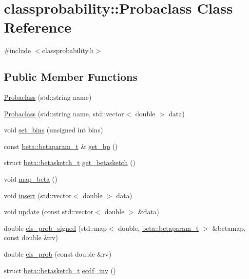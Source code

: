 \hypertarget{classclassprobability_1_1_probaclass}{}\section{classprobability\+:\+:Probaclass Class Reference}
\label{classclassprobability_1_1_probaclass}


{\ttfamily \#include $<$classprobability.\+h$>$}

\subsection*{Public Member Functions}
\begin{DoxyCompactItemize}
\item 
\hyperlink{classclassprobability_1_1_probaclass_a06ff3fdb60cfa668c8c7ade67b699775}{Probaclass} (std\+::string name)
\item 
\hyperlink{classclassprobability_1_1_probaclass_ab8a1155baa99003fc7bc1704b94522c2}{Probaclass} (std\+::string name, std\+::vector$<$ double $>$ data)
\item 
void \hyperlink{classclassprobability_1_1_probaclass_a9c4058ea810bb0f624f979650fc58986}{set\+\_\+bins} (unsigned int bins)
\item 
const \hyperlink{structclassprobability_1_1beta_1_1betaparam__t}{beta\+::betaparam\+\_\+t} \& \hyperlink{classclassprobability_1_1_probaclass_a8863bbdbf8a66362cb87886bfe75d49f}{get\+\_\+bp} ()
\item 
struct \hyperlink{structclassprobability_1_1beta_1_1betasketch__t}{beta\+::betasketch\+\_\+t} \hyperlink{classclassprobability_1_1_probaclass_a48c45140762604e5f7bfc8bc532e20b1}{get\+\_\+betasketch} ()
\item 
void \hyperlink{classclassprobability_1_1_probaclass_a2c96ae10e7c464ef31e3975fc9d2dbf9}{map\+\_\+beta} ()
\item 
void \hyperlink{classclassprobability_1_1_probaclass_ac096a46f36d394976a4bdafc075006bb}{insert} (std\+::vector$<$ double $>$ data)
\item 
void \hyperlink{classclassprobability_1_1_probaclass_a27bcfca6ba7b7faadc3428b7567821ca}{update} (const std\+::vector$<$ double $>$ \&data)
\item 
double \hyperlink{classclassprobability_1_1_probaclass_a3d2ed53e923b773a39719467e8159032}{cls\+\_\+prob\+\_\+signed} (std\+::map$<$ double, \hyperlink{structclassprobability_1_1beta_1_1betaparam__t}{beta\+::betaparam\+\_\+t} $>$ \&betamap, const double \&rv)
\item 
double \hyperlink{classclassprobability_1_1_probaclass_a04703e64e79ca5439b0015cea6fd5fb0}{cls\+\_\+prob} (const double \&rv)
\item 
struct \hyperlink{structclassprobability_1_1beta_1_1betasketch__t}{beta\+::betasketch\+\_\+t} \hyperlink{classclassprobability_1_1_probaclass_ad511d09840217a26fb0079ef52dc7188}{ecdf\+\_\+inv} ()
\end{DoxyCompactItemize}
